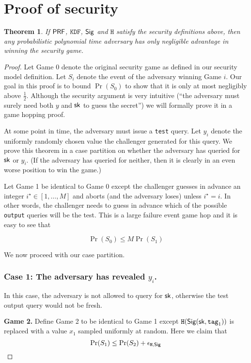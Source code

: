 \documentclass[12pt]{article}
\newtheorem{theorem}{Theorem}[section]
\begin{document}
\section{Proof of security} \label{proof}

\begin{theorem}
If $\mathsf{PRF}$, $\texttt{KDF}$, $\mathsf{Sig}$ and $\texttt{H}$ satisfy the security definitions above, then any probabilistic polynomial time adversary has only negligible advantage in winning the security game.
\end{theorem}

\begin{proof}
Let Game 0 denote the original security game as defined in our security model definition. Let $S_i$ denote the event of the adversary winning Game $i$. Our goal in this proof is to bound $\Pr(S_0)$ to show that it is only at most negligibly above $\frac{1}{2}$. Although the security argument is very intuitive (``the adversary must surely need both $y$ and $\mathsf{sk}$ to guess the secret'') we will formally prove it in a game hopping proof.

At some point in time, the adversary must issue a \texttt{test} query. Let $y_i$ denote the uniformly randomly chosen value the challenger generated for this query. We prove this theorem in a case partition on whether the adversary has queried for $\mathsf{sk}$ or $y_i$. (If the adversary has queried for neither, then it is clearly in an even worse position to win the game.) 

Let Game 1 be identical to Game 0 except the challenger guesses in advance an integer $i^{\star} \in [1, \dots, M]$ and aborts (and the adversary loses) unless $i^{\star} = i$. In other words, the challenger needs to guess in advance which of the possible \texttt{output} queries will be the test. This is a large failure event game hop and it is easy to see that

$$
\Pr(S_0) \le M \Pr(S_1)
$$

\noindent We now proceed with our case partition.

\subsubsection*{Case 1: The adversary has revealed $y_i$.} In this case, the adversary is not allowed to query for $\mathsf{sk}$, otherwise the test output query would not be fresh.

\noindent \textbf{Game 2.} Define Game 2 to be identical to Game 1 except $\texttt{H}(\mathsf{Sig}(\mathsf{sk}, \texttt{tag}_1))$ is replaced with a value $x_1$ sampled uniformly at random. Here we claim that
$$\Pr(S_1) \le  \Pr(S_2) + \epsilon_{\texttt{H}, \mathsf{Sig}}$$


\end{proof}
\end{document}
